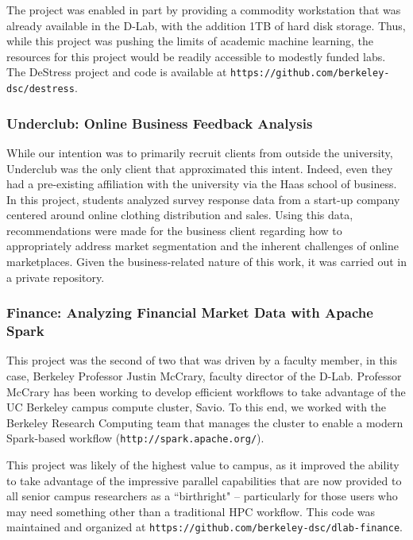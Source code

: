\documentclass[12pt]{article}
\begin{document}
The project was enabled in part by providing a commodity workstation that was already available in the D-Lab, with the addition 1TB of hard disk storage. Thus, while this project was pushing the limits of academic machine learning, the resources for this project would be readily accessible to modestly funded labs.  The DeStress project and code is available at \texttt{https://github.com/berkeley-dsc/destress}.

\subsubsection*{Underclub: Online Business Feedback Analysis}

While our intention was to primarily recruit clients from outside the university, Underclub was the only client that approximated this intent. Indeed, even they had a pre-existing affiliation with the university via the Haas school of business.  In this project, students analyzed survey response data from a start-up company centered around online clothing distribution and sales.  Using this data, recommendations were made for the business client regarding how to appropriately address market segmentation and the inherent challenges of online marketplaces.  Given the business-related nature of this work, it was carried out in a private repository.

\subsubsection*{Finance: Analyzing Financial Market Data with Apache Spark}

This project was the second of two that was driven by a faculty member, in this case, Berkeley Professor Justin McCrary, faculty director of the D-Lab. Professor McCrary has been working to develop efficient workflows to take advantage of the UC Berkeley campus compute cluster, Savio. To this end, we worked with the Berkeley Research Computing team that manages the cluster to enable a modern Spark-based workflow (\texttt{http://spark.apache.org/}).

This project was likely of the highest value to campus, as it improved the ability to take advantage of the impressive parallel capabilities that are now provided to all senior campus researchers as a ``birthright" -- particularly for those users who may need something other than a traditional HPC workflow. This code was maintained and organized at \texttt{https://github.com/berkeley-dsc/dlab-finance}.
\end{document}
